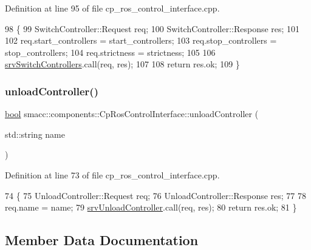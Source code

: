 Definition at line 95 of file cp\+\_\+ros\+\_\+control\+\_\+interface.\+cpp.


\begin{DoxyCode}
98 \{
99     SwitchController::Request req;
100     SwitchController::Response res;
101 
102     req.start\_controllers = start\_controllers;
103     req.stop\_controllers = stop\_controllers;
104     req.strictness = strictness;
105 
106     \hyperlink{classsmacc_1_1components_1_1CpRosControlInterface_a78e45e68567c23ca5c19df0de257c20f}{srvSwitchControllers}.call(req, res);
107 
108     \textcolor{keywordflow}{return} res.ok;
109 \}
\end{DoxyCode}
\mbox{\label{classsmacc_1_1components_1_1CpRosControlInterface_a0c65acff40f36a15c67fab7c77ca23c8}} 
\subsubsection{\texorpdfstring{unload\+Controller()}{unloadController()}}
{\footnotesize\ttfamily \hyperlink{classbool}{bool} smacc\+::components\+::\+Cp\+Ros\+Control\+Interface\+::unload\+Controller (\begin{DoxyParamCaption}\item[{std\+::string}]{name }\end{DoxyParamCaption})}



Definition at line 73 of file cp\+\_\+ros\+\_\+control\+\_\+interface.\+cpp.


\begin{DoxyCode}
74 \{
75     UnloadController::Request req;
76     UnloadController::Response res;
77 
78     req.name = name;
79     \hyperlink{classsmacc_1_1components_1_1CpRosControlInterface_a0515a2a86bfcd0fdec08fabd3070723c}{srvUnloadController}.call(req, res);
80     \textcolor{keywordflow}{return} res.ok;
81 \}
\end{DoxyCode}


\subsection{Member Data Documentation}
\mbox{\label{classsmacc_1_1components_1_1CpRosControlInterface_a58b15bd11d13cb02813232c6e50adbd2}} 
